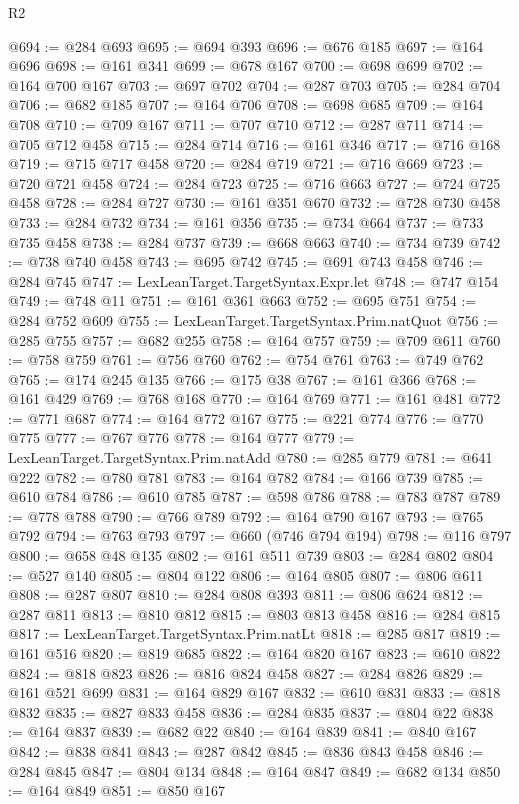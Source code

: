 \begin{lexlean}{R2}
\begin{coremodule}
@694 := @284 @693
@695 := @694 @393
@696 := @676 @185
@697 := @164 @696
@698 := @161 @341
@699 := @678 @167
@700 := @698 @699
@702 := @164 @700 @167
@703 := @697 @702
@704 := @287 @703
@705 := @284 @704
@706 := @682 @185
@707 := @164 @706
@708 := @698 @685
@709 := @164 @708
@710 := @709 @167
@711 := @707 @710
@712 := @287 @711
@714 := @705 @712 @458
@715 := @284 @714
@716 := @161 @346
@717 := @716 @168
@719 := @715 @717 @458
@720 := @284 @719
@721 := @716 @669
@723 := @720 @721 @458
@724 := @284 @723
@725 := @716 @663
@727 := @724 @725 @458
@728 := @284 @727
@730 := @161 @351 @670
@732 := @728 @730 @458
@733 := @284 @732
@734 := @161 @356
@735 := @734 @664
@737 := @733 @735 @458
@738 := @284 @737
@739 := @668 @663
@740 := @734 @739
@742 := @738 @740 @458
@743 := @695 @742
@745 := @691 @743 @458
@746 := @284 @745
@747 := LexLeanTarget.TargetSyntax.Expr.let
@748 := @747 @154
@749 := @748 @11
@751 := @161 @361 @663
@752 := @695 @751
@754 := @284 @752 @609
@755 := LexLeanTarget.TargetSyntax.Prim.natQuot
@756 := @285 @755
@757 := @682 @255
@758 := @164 @757
@759 := @709 @611
@760 := @758 @759
@761 := @756 @760
@762 := @754 @761
@763 := @749 @762
@765 := @174 @245 @135
@766 := @175 @38
@767 := @161 @366
@768 := @161 @429
@769 := @768 @168
@770 := @164 @769
@771 := @161 @481
@772 := @771 @687
@774 := @164 @772 @167
@775 := @221 @774
@776 := @770 @775
@777 := @767 @776
@778 := @164 @777
@779 := LexLeanTarget.TargetSyntax.Prim.natAdd
@780 := @285 @779
@781 := @641 @222
@782 := @780 @781
@783 := @164 @782
@784 := @166 @739
@785 := @610 @784
@786 := @610 @785
@787 := @598 @786
@788 := @783 @787
@789 := @778 @788
@790 := @766 @789
@792 := @164 @790 @167
@793 := @765 @792
@794 := @763 @793
@797 := @660 (@746 @794 @194)
@798 := @116 @797
@800 := @658 @48 @135
@802 := @161 @511 @739
@803 := @284 @802
@804 := @527 @140
@805 := @804 @122
@806 := @164 @805
@807 := @806 @611
@808 := @287 @807
@810 := @284 @808 @393
@811 := @806 @624
@812 := @287 @811
@813 := @810 @812
@815 := @803 @813 @458
@816 := @284 @815
@817 := LexLeanTarget.TargetSyntax.Prim.natLt
@818 := @285 @817
@819 := @161 @516
@820 := @819 @685
@822 := @164 @820 @167
@823 := @610 @822
@824 := @818 @823
@826 := @816 @824 @458
@827 := @284 @826
@829 := @161 @521 @699
@831 := @164 @829 @167
@832 := @610 @831
@833 := @818 @832
@835 := @827 @833 @458
@836 := @284 @835
@837 := @804 @22
@838 := @164 @837
@839 := @682 @22
@840 := @164 @839
@841 := @840 @167
@842 := @838 @841
@843 := @287 @842
@845 := @836 @843 @458
@846 := @284 @845
@847 := @804 @134
@848 := @164 @847
@849 := @682 @134
@850 := @164 @849
@851 := @850 @167

\end{coremodule}
\end{lexlean}
